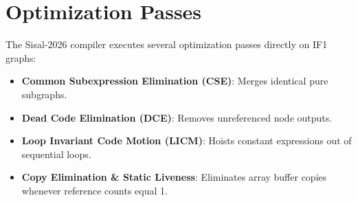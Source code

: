 \section{Optimization Passes}
The Sisal-2026 compiler executes several optimization passes directly on IF1 graphs:
\begin{itemize}
    \item \textbf{Common Subexpression Elimination (CSE)}: Merges identical pure subgraphs.
    \item \textbf{Dead Code Elimination (DCE)}: Removes unreferenced node outputs.
    \item \textbf{Loop Invariant Code Motion (LICM)}: Hoists constant expressions out of sequential loops.
    \item \textbf{Copy Elimination \& Static Liveness}: Eliminates array buffer copies whenever reference counts equal 1.
\end{itemize}
